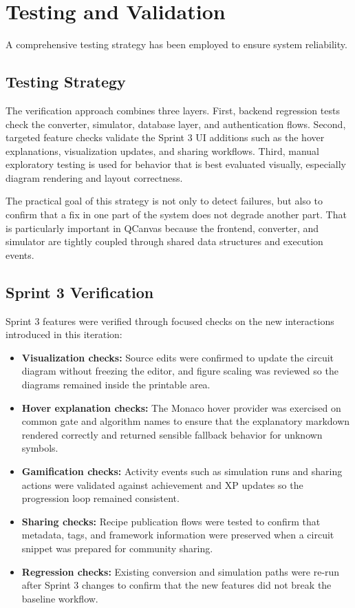\section{Testing and Validation}

A comprehensive testing strategy has been employed to ensure system reliability.

\subsection{Testing Strategy}

The verification approach combines three layers. First, backend regression tests check the converter, simulator, database layer, and authentication flows. Second, targeted feature checks validate the Sprint 3 UI additions such as the hover explanations, visualization updates, and sharing workflows. Third, manual exploratory testing is used for behavior that is best evaluated visually, especially diagram rendering and layout correctness.

The practical goal of this strategy is not only to detect failures, but also to confirm that a fix in one part of the system does not degrade another part. That is particularly important in QCanvas because the frontend, converter, and simulator are tightly coupled through shared data structures and execution events.

\subsection{Sprint 3 Verification}

Sprint 3 features were verified through focused checks on the new interactions introduced in this iteration:

\begin{itemize}
    \item \textbf{Visualization checks:} Source edits were confirmed to update the circuit diagram without freezing the editor, and figure scaling was reviewed so the diagrams remained inside the printable area.
    \item \textbf{Hover explanation checks:} The Monaco hover provider was exercised on common gate and algorithm names to ensure that the explanatory markdown rendered correctly and returned sensible fallback behavior for unknown symbols.
    \item \textbf{Gamification checks:} Activity events such as simulation runs and sharing actions were validated against achievement and XP updates so the progression loop remained consistent.
    \item \textbf{Sharing checks:} Recipe publication flows were tested to confirm that metadata, tags, and framework information were preserved when a circuit snippet was prepared for community sharing.
    \item \textbf{Regression checks:} Existing conversion and simulation paths were re-run after Sprint 3 changes to confirm that the new features did not break the baseline workflow.
\end{itemize}

